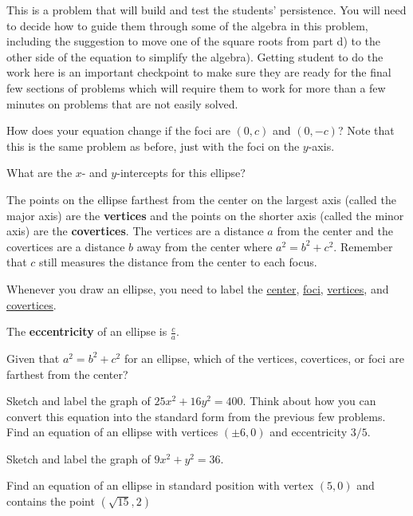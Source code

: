 \begin{annotation}
This is a problem that will build and test the students' persistence. You will need to decide how to guide them through some of the algebra in this problem, including the suggestion to move one of the square roots from part d) to the other side of the equation to simplify the algebra). Getting student to do the work here is an important checkpoint to make sure they are ready for the final few sections of problems which will require them to work for more than a few minutes on problems that are not easily solved.
\end{annotation}
\bq \be
\item How does your equation change if the foci are $(0,c)$ and $(0,-c)$? Note that this is the same problem as before, just with the foci on the $y$-axis.
\item What are the $x$- and $y$-intercepts for this ellipse?
\ee \eq

\begin{info}
The points on the ellipse farthest from the center on the largest axis (called the major axis) are the \textbf{vertices} and the points on the shorter axis (called the minor axis) are the \textbf{covertices}. The vertices are a distance $a$ from the center and the covertices are a distance $b$ away from the center where $a^2=b^2+c^2$. Remember that $c$ still measures the distance from the center to each focus.

Whenever you draw an ellipse, you need to label the \underline{center}, \underline{foci}, \underline{vertices}, and \underline{covertices}.

The \textbf{eccentricity} of an ellipse is $\frac{c}{a}$. \end{info}

\bq Given that $a^2=b^2+c^2$ for an ellipse, which of the vertices, covertices, or foci are farthest from the center? \eq

\bq Sketch and label the graph of $25x^2+16y^2=400$. Think about how you can convert this equation into the standard form from the previous few problems.
\eq
\bq Find an equation of an ellipse with vertices $(\pm 6,0)$ and eccentricity $3/5$. \eq

\bq Sketch and label the graph of $9x^2+y^2=36$. \eq

\bq Find an equation of an ellipse in standard position with vertex $(5,0)$ and contains the point $(\sqrt{15},2)$ \eq

\bq\label{eq1}


